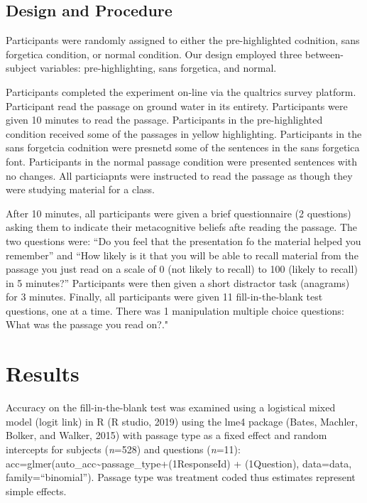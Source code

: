 \documentclass[pdf]{apa6}
\begin{document}
\hypertarget{design-and-procedure}{%
\subsection{Design and Procedure}\label{design-and-procedure}}

Participants were randomly assigned to either the pre-highlighted codnition, sans forgetica condition, or normal condition. Our design employed three between-subject variables: pre-highlighting, sans forgetica, and normal.

Participants completed the experiment on-line via the qualtrics survey platform. Participant read the passage on ground water in its entirety. Participants were given 10 minutes to read the passage. Participants in the pre-highlighted condition received some of the passages in yellow highlighting. Participants in the sans forgetcia codnition were presnetd some of the sentences in the sans forgetica font. Participants in the normal passage condition were presented sentences with no changes. All particiapnts were instructed to read the passage as though they were studying material for a class.

After 10 minutes, all participants were given a brief questionnaire (2 questions) asking them to indicate their metacognitive beliefs afte reading the passage. The two questions were: \enquote{Do you feel that the presentation fo the material helped you remember} and \enquote{How likely is it that you will be able to recall material from the passage you just read on a scale of 0 (not likely to recall) to 100 (likely to recall) in 5 minutes?} Participants were then given a short distractor task (anagrams) for 3 minutes. Finally, all participants were given 11 fill-in-the-blank test questions, one at a time. There was 1 manipulation multiple choice questions: What was the passage you read on?."

\hypertarget{results-2}{%
\section{Results}\label{results-2}}

Accuracy on the fill-in-the-blank test was examined using a logistical mixed model (logit link) in R (R studio, 2019) using the lme4 package (Bates, Machler, Bolker, and Walker, 2015) with passage type as a fixed effect and random intercepts for subjects (\emph{n}=528) and questions (\emph{n}=11): acc=glmer(auto\_acc\textasciitilde{}passage\_type+(1\textbar{}ResponseId) + (1\textbar{}Question), data=data, family=\enquote{binomial}). Passage type was treatment coded thus estimates represent simple effects.
\end{document}
